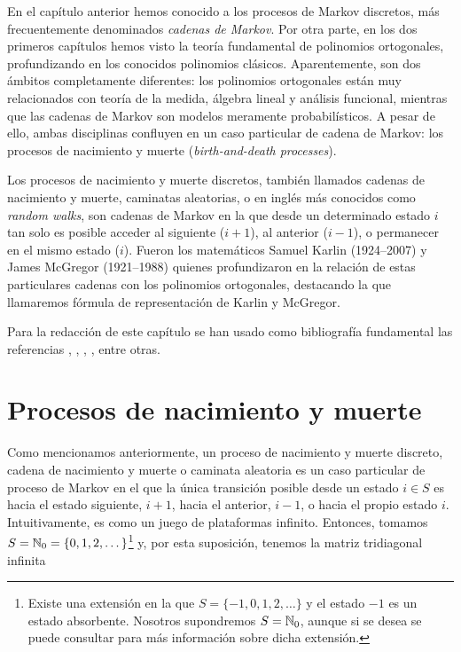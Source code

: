 
En el capítulo anterior hemos conocido a los procesos de Markov discretos, más frecuentemente denominados \textit{cadenas de Markov}. Por otra parte, en los dos primeros capítulos hemos visto la teoría fundamental de polinomios ortogonales, profundizando en los conocidos polinomios clásicos. Aparentemente, son dos ámbitos completamente diferentes: los polinomios ortogonales están muy relacionados con teoría de la medida, álgebra lineal y análisis funcional, mientras que las cadenas de Markov son modelos meramente probabilísticos. A pesar de ello, ambas disciplinas confluyen en un caso particular de cadena de Markov: los procesos de nacimiento y muerte (\textit{birth-and-death processes}). 

Los procesos de nacimiento y muerte discretos, también llamados cadenas de nacimiento y muerte, caminatas aleatorias, o en inglés más conocidos como \textit{random walks}, son cadenas de Markov en la que desde un determinado estado $i$ tan solo es posible acceder al siguiente ($i+1$), al anterior ($i-1$), o permanecer en el mismo estado ($i$). Fueron los matemáticos Samuel Karlin (1924--2007) y James McGregor (1921--1988) quienes profundizaron en la relación de estas particulares cadenas con los polinomios ortogonales, destacando la que llamaremos fórmula de representación de Karlin y McGregor.

Para la redacción de este capítulo se han usado como bibliografía fundamental las referencias \cite[Ch. II]{Manuel}, \cite[Ch. II]{schoutens-2000}, \cite{random-walks}, \cite{Linear-Growth}, entre otras.

\section{Procesos de nacimiento y muerte}

Como mencionamos anteriormente, un proceso de nacimiento y muerte discreto, cadena de nacimiento y muerte o caminata aleatoria es un caso particular de proceso de Markov en el que la única transición posible desde un estado $i\in S$ es hacia el estado siguiente, $i+1$, hacia el anterior, $i-1$, o hacia el propio estado $i$. Intuitivamente, es como un juego de plataformas infinito. Entonces, tomamos $S=\mathbb{N}_0 = \{0,1,2,\dots\}$\footnote{Existe una extensión en la que $S = \{-1,0,1,2,\dots\}$ y el estado $-1$ es un estado absorbente. Nosotros supondremos $S=\mathbb{N}_0$, aunque si se desea se puede consultar \cite[Ch. II, Section 2.3]{schoutens-2000} para más información sobre dicha extensión.} y, por esta suposición, tenemos la matriz tridiagonal infinita

